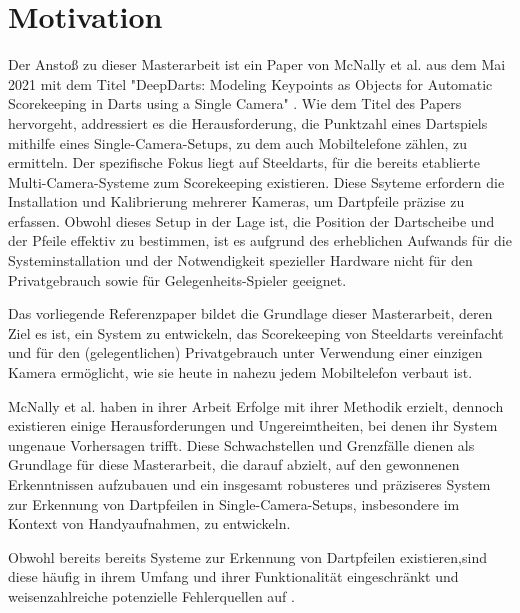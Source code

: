 \section{Motivation}
\label{sec:motivation}

Der Anstoß zu dieser Masterarbeit ist ein Paper von McNally et al. aus dem Mai 2021 mit dem Titel "DeepDarts: Modeling Keypoints as Objects for Automatic Scorekeeping in Darts using a Single Camera" \cite{deepdarts}. Wie dem Titel des Papers hervorgeht, addressiert es die Herausforderung, die Punktzahl eines Dartspiels mithilfe eines Single-Camera-Setups, zu dem auch Mobiltelefone zählen, zu ermitteln. Der spezifische Fokus liegt auf Steeldarts, für die bereits etablierte Multi-Camera-Systeme zum Scorekeeping existieren. Diese Ssyteme erfordern die Installation und Kalibrierung mehrerer Kameras, um Dartpfeile präzise zu erfassen. Obwohl dieses Setup in der Lage ist, die Position der Dartscheibe und der Pfeile effektiv zu bestimmen, ist es aufgrund des erheblichen Aufwands für die Systeminstallation und der Notwendigkeit spezieller Hardware nicht für den Privatgebrauch sowie für Gelegenheits-Spieler geeignet.

Das vorliegende Referenzpaper bildet die Grundlage dieser Masterarbeit, deren Ziel es ist, ein System zu entwickeln, das Scorekeeping von Steeldarts vereinfacht und für den (gelegentlichen) Privatgebrauch unter Verwendung einer einzigen Kamera ermöglicht, wie sie heute in nahezu jedem Mobiltelefon verbaut ist.

McNally et al. haben in ihrer Arbeit Erfolge mit ihrer Methodik erzielt, dennoch existieren einige Herausforderungen und Ungereimtheiten, bei denen ihr System ungenaue Vorhersagen trifft. Diese Schwachstellen und Grenzfälle dienen als Grundlage für diese Masterarbeit, die darauf abzielt, auf den gewonnenen Erkenntnissen aufzubauen und ein insgesamt robusteres und präziseres System zur Erkennung von Dartpfeilen in Single-Camera-Setups, insbesondere im Kontext von Handyaufnahmen, zu entwickeln.

Obwohl bereits bereits Systeme zur Erkennung von Dartpfeilen existieren,sind diese häufig in ihrem Umfang und ihrer Funktionalität eingeschränkt und weisenzahlreiche potenzielle Fehlerquellen auf \cite{dartscore-repo}.

\iffalse

